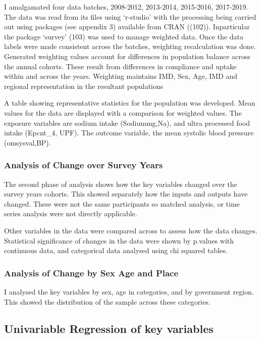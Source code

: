 \documentclass[
]{article}
\begin{document}
I amalgamated four data batches, 2008-2012, 2013-2014, 2015-2016,
2017-2019. The data was read from its files using `r-studio' with the
processing being carried out using packages (see appendix 3) available
from CRAN ((102)). Inparticular the package `survey' (103) was used to
manage weighted data. Once the data labels were made consistent across
the batches, weighting recalculation was done. Generated weighting
values account for differences in population balance across the annual
cohorts. These result from differences in compliance and uptake within
and across the years. Weighting maintains IMD, Sex, Age, IMD and
regional representation in the resultant populations

A table showing representative statistics for the population was
developed. Mean values for the data are displayed with a comparison for
weighted values. The exposure variables are sodium intake (Sodiummg,Na),
and ultra processed food intake (Epcnt\_4, UPF). The outcome variable,
the mean systolic blood pressure (omsysval,BP).

\hypertarget{analysis-of-change-over-survey-years}{%
\subsubsection{Analysis of Change over Survey
Years}\label{analysis-of-change-over-survey-years}}

The second phase of analysis shows how the key variables changed over
the survey years cohorts. This showed separately how the inputs and
outputs have changed. These were not the same participants so matched
analysis, or time series analysis were not directly applicable.

Other variables in the data were compared across to assess how the data
changes. Statistical significance of changes in the data were shown by
p.values with continuous data, and categorical data analysed using chi
squared tables.

\hypertarget{analysis-of-change-by-sex-age-and-place}{%
\subsubsection{Analysis of Change by Sex Age and
Place}\label{analysis-of-change-by-sex-age-and-place}}

I analysed the key variables by sex, age in categories, and by
government region. This showed the distribution of the sample across
these categories.

\hypertarget{univariable-regression-of-key-variables}{%
\subsection{Univariable Regression of key
variables}\label{univariable-regression-of-key-variables}}
\end{document}
